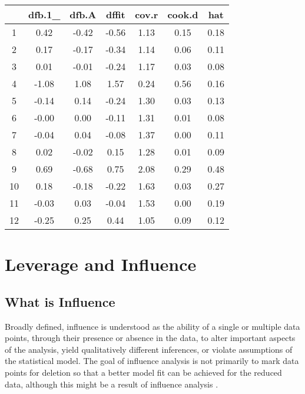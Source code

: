\documentclass[12pt, a4paper]{article}
\begin{document}
	
	
	
	
	
	
	
	\begin{table}[ht]
		\begin{center}
			\begin{tabular}{|c|c|c|c|c|c|c|}
				\hline
				& dfb.1\_ & dfb.A & dffit & cov.r & cook.d & hat \\
				\hline
				1 & 0.42 & -0.42 & -0.56 & 1.13 & 0.15 & 0.18 \\
				2 & 0.17 & -0.17 & -0.34 & 1.14 & 0.06 & 0.11 \\
				3 & 0.01 & -0.01 & -0.24 & 1.17 & 0.03 & 0.08 \\
				4 & -1.08 & 1.08 & 1.57 & 0.24 & 0.56 & 0.16 \\
				5 & -0.14 & 0.14 & -0.24 & 1.30 & 0.03 & 0.13 \\
				6 & -0.00 & 0.00 & -0.11 & 1.31 & 0.01 & 0.08 \\
				7 & -0.04 & 0.04 & -0.08 & 1.37 & 0.00 & 0.11 \\
				8 & 0.02 & -0.02 & 0.15 & 1.28 & 0.01 & 0.09 \\
				9 & 0.69 & -0.68 & 0.75 & 2.08 & 0.29 & 0.48 \\
				10 & 0.18 & -0.18 & -0.22 & 1.63 & 0.03 & 0.27 \\
				11 & -0.03 & 0.03 & -0.04 & 1.53 & 0.00 & 0.19 \\
				12 & -0.25 & 0.25 & 0.44 & 1.05 & 0.09 & 0.12 \\
				\hline
			\end{tabular}
		\end{center}
	\end{table}
\section{Leverage and Influence}
	\subsection{What is Influence} %
	
	Broadly defined, influence is understood as the ability of a single or multiple data points, through their presence or absence in the data, to alter important aspects of the analysis, yield qualitatively different inferences, or violate assumptions of the statistical model. The goal of influence analysis is not primarily to mark data
	points for deletion so that a better model fit can be achieved for the reduced data, although this might be a result of influence analysis \citep{schabenberger}.
	
\end{document}
